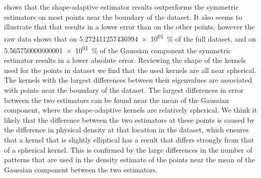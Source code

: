 		 shows that the shape-adaptive estimator results outperforms the symmetric estimators on most points near the boundary of the dataset. It also seems to illustrate that that \mbe results in a lower error than \sambe on the other points, however the raw data shows that on \SI{5.272411257436994e+01}{\percent} of the full dataset, and on \SI{5.565750000000001e+01}{\percent} of the Gaussian component the symmetric estimator results in a lower absolute error.
		Reviewing the shape of the kernels used for the points in dataset \ferdosiOne we find that the used kernels are all near spherical. The kernels with the largest differences between their eigenvalues are associated with points near the boundary of the dataset. 
		The largest differences in error between the two estimators can be found near the mean of the Gaussian component, where the shape-adaptive kernels are relatively spherical. We think it likely that the difference between the two estimators at these points is caused by the difference in physical density at that location in the dataset, which ensures that a kernel that is slightly elliptical has a result that differs strongly from that of a spherical kernel. This is confirmed by the large differences in the number of patterns that are used in the density estimate of the points near the mean of the Gaussian component between the two estimators. 




